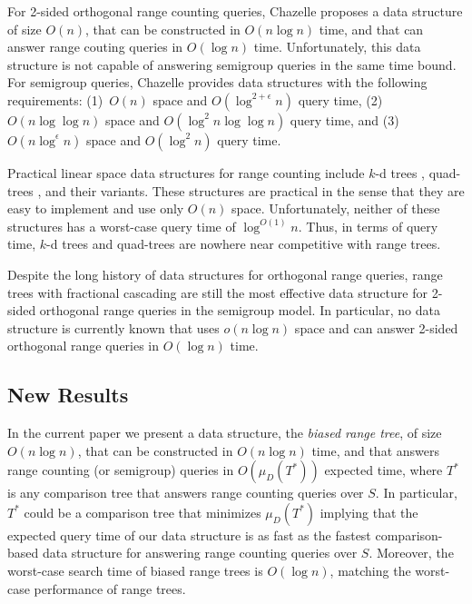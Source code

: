 \documentclass[lotsofwhite,charterfonts]{patmorin}
\begin{document}
For 2-sided orthogonal range counting queries, Chazelle
\cite{ae55,ae58} proposes a data structure of size $O(n)$, that can be
constructed in $O(n\log n)$ time, and that can answer range couting
queries in $O(\log n)$ time.  Unfortunately, this data structure is
not capable of answering semigroup queries in the same time bound.
For semigroup queries, Chazelle provides data structures with the
following requirements: (1)~$O(n)$ space and $O(\log^{2+\epsilon} n)$
query time, (2)~$O(n\log\log n)$ space and $O(\log^{2}n\log\log n)$
query time, and (3)~$O(n\log^\epsilon n)$ space and $O(\log^2 n)$
query time.

Practical linear space data structures for range counting include
$k$-d trees \cite{ae41}, quad-trees \cite{ae251}, and their
variants.  These structures are practical in the sense that they are
easy to implement and use only $O(n)$ space.  Unfortunately, neither
of these structures has a worst-case query time of $\log^{O(1)} n$.
Thus, in terms of query time, $k$-d trees and quad-trees are nowhere
near competitive with range trees.


Despite the long history of data structures for orthogonal range
queries, range trees with fractional cascading are still the most
effective data structure for 2-sided orthogonal range queries in the
semigroup model.  In particular, no data structure is currently known
that uses $o(n\log n)$ space and can answer 2-sided orthogonal range
queries in $O(\log n)$ time. 

\subsection{New Results}

In the current paper we present a data structure, the \emph{biased
range tree}, of size $O(n\log n)$, that can be constructed in $O(n\log
n)$ time, and that answers range counting (or semigroup) queries in
$O(\mu_D(T^*))$ expected time, where $T^*$ is any comparison tree that
answers range counting queries over $S$.  In particular, $T^*$ could
be a comparison tree that minimizes $\mu_D(T^*)$ implying that the
expected query time of our data structure is as fast as the fastest
comparison-based data structure for answering range counting queries
over $S$.  Moreover, the worst-case search time of biased range trees
is $O(\log n)$, matching the worst-case performance of range trees.
\end{document}
